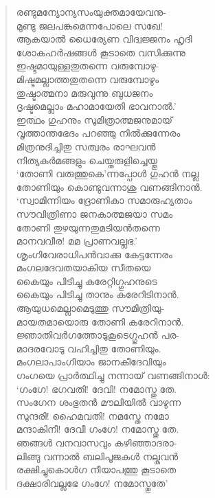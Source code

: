 \begin{verse}
രണ്ടുമന്യോന്യസംയുക്തമായേവനു-\\
മുണ്ടു ജലപങ്കമെന്നപോലെ സഖേ!\\
ആകയാല്‍ ധൈര്യേണ വിദ്വജ്ജനം	ഹൃദി\\
ശോകഹര്‍ഷങ്ങള്‍ കൂടാതെ വസിക്കുന്നു\\
ഇഷ്ടമായുള്ളതുതന്നെ വരുമ്പോഴു-\\
മിഷ്ടമല്ലാത്തതുതന്നെ വരുമ്പോഴും\\
തുഷ്ടാത്മനാ മരുവുന്നു ബുധജനം\\
ദൃഷ്ടമെല്ലാം മഹാമായേതി ഭാവനാല്‍.’\\
ഇത്ഥം ഗുഹനും സുമിത്രാത്മജനുമായ്\\
വൃത്താന്തഭേദം പറഞ്ഞു നില്‍ക്കുന്നേരം\\
മിത്രനുദിച്ചിതു സത്വരം രാഘവന്‍\\
നിത്യകര്‍മങ്ങളും ചെയ്തരുളിച്ചെയ്തു\\
‘തോണി വരുത്തുകെ’ന്നപ്പോള്‍ ഗുഹന്‍ നല്ല\\
തോണിയും കൊണ്ടുവന്നാശു വണങ്ങിനാന്‍.\\
‘സ്വാമിന്നിയം ദ്രോണികാ സമാരുഹ്യതാം\\
സൗവിത്രിണാ ജനകാത്മജയാ സമം\\
തോണി തുഴയുന്നതുമടിയന്‍തന്നെ\\
മാനവവീര! മമ പ്രാണവല്ലഭ.’\\
ശൃംഗിവേരാധിപന്‍വാക്കു കേട്ടന്നേരം\\
മംഗലദേവതയാകിയ സീതയെ\\
കൈയും പിടിച്ചു കരേറ്റിഗ്ഗുഹനുടെ\\
കൈയും പിടിച്ചു താനും കരേറിടിനാന്‍.\\
ആയുധമെല്ലാമെടുത്തു സൗമിത്രിയു-\\
മായതമായൊരു തോണി കരേറിനാന്‍.\\
ജ്ഞാതിവര്‍ഗത്തോടുകൂടെഗ്ഗുഹന്‍ പര-\\
മാദരവോടു വഹിച്ചിതു തോണിയും.\\
മംഗലാപാംഗിയാം ജാനകീദേവിയും\\
ഗംഗയെ പ്രാര്‍ത്ഥിച്ചു നന്നായ് വണങ്ങിനാള്‍:\\
‘ഗംഗേ! ഭഗവതി! ദേവി! നമോസ്തു തേ.\\
സംഗേന ശംഭുതന്‍ മൗലിയില്‍ വാഴുന്ന\\
സുന്ദരി! ഹൈമവതി! നമസ്തേ നമോ\\
മന്ദാകിനീ! ദേവീ ഗംഗേ! നമോസ്തു തേ.\\
ഞങ്ങള്‍ വനവാസവും കഴിഞ്ഞാദരാ-\\
ലിങ്ങു വന്നാല്‍ ബലിപൂജകള്‍ നല്കുവന്‍\\
രക്ഷിച്ചുകൊള്‍ഗ നീയാപത്തു കൂടാതെ\\
ദക്ഷാരിവല്ലഭേ ഗംഗേ! നമോസ്തുതേ’\\

\end{verse}
